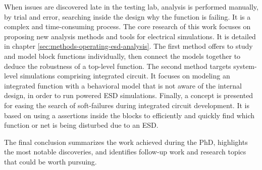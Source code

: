 %
When issues are discovered late in the testing lab, analysis is performed manually, by trial and error, searching inside the design why the function is failing.
It is a complex and time-consuming process.
The core research of this work focuses on proposing new analysis methods and tools for electrical simulations.
It is detailed in chapter \ref{sec:methods-operating-esd-analysis}.
The first method offers to study and model block functions individually, then connect the models together to deduce the robustness of a top-level function.
The second method targets system-level simulations comprising integrated circuit.
It focuses on modeling an integrated function with a behavioral model that is not aware of the internal design, in order to run powered ESD simulations.
Finally, a concept is presented for easing the search of soft-failures during integrated circuit development.
It is based on using a assertions inside the blocks to efficiently and quickly find which function or net is being disturbed due to an ESD.

%
The final conclusion summarizes the work achieved during the PhD, highlights the most notable discoveries, and identifies follow-up work and research topics that could be worth pursuing.
